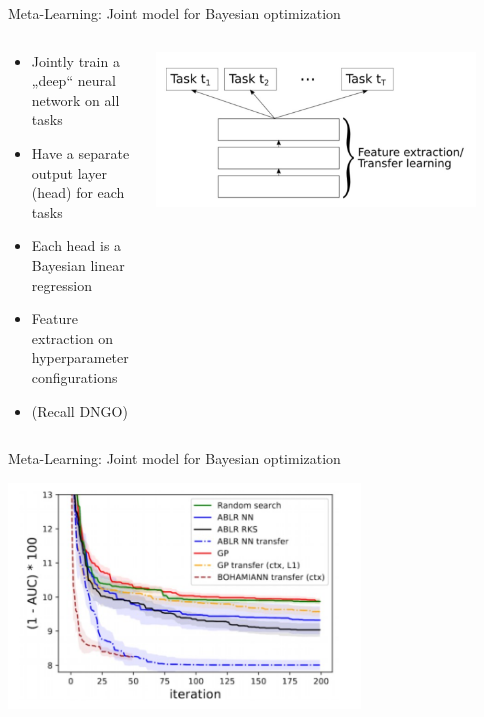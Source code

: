 \begin{frame}[c]{Meta-Learning: Joint model for Bayesian optimization}

\begin{columns}[T] %
\begin{column}{.38\textwidth}

\begin{itemize}
    \item<1-5> Jointly train a „deep“ neural network on all tasks 
    \item<2-5> Have a separate output layer (head) for each tasks 
    \item<3-5> Each head is a Bayesian linear regression 
    \item<4-5> Feature extraction on hyperparameter configurations 
    \item<5-5> (Recall DNGO)
\end{itemize}
\end{column}%

\hfill%

\begin{column}{.58\textwidth}
\includegraphics[width=0.9\textwidth]{images/meta_learning/perrone_int.jpg}
\end{column}%
\end{columns}


\end{frame}
\begin{frame}[c]{Meta-Learning: Joint model for Bayesian optimization}
	
\centering
\includegraphics[width=0.7\textwidth]{images/meta_learning/perrone_res.jpg}

\end{frame}
